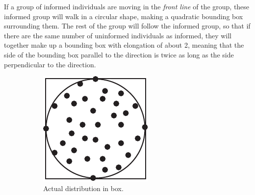 If a group of informed individuals are moving in the \emph{front line} of the group, these informed group will walk in a circular shape, making a quadratic bounding box surrounding them. 
The rest of the group will follow the informed group, so that if there are the same number of uninformed individuals as informed, they will together make up a bounding box with elongation of about 2, meaning that the side of the bounding box parallel to the direction is twice as long as the side perpendicular to the direction.
\newcommand{\figwidth}{0.21\textwidth}
\begin{figure}[H]
	\centering
	\begin{subfigure}[b]{\figwidth}
		\includegraphics[width=\textwidth]{img/Circle.pdf}
		\caption{Actual distribution in box.\\\ }
		\label{fig:hitratio-nb}
	\end{subfigure}
	~
	\begin{subfigure}[b]{\figwidth}

\end{subfigure}
\end{figure}
